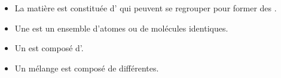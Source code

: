 \begin{mybilan}
	\begin{itemize}
		\item La matière est constituée d' qui peuvent se regrouper pour former des . 
		\item Une  est un ensemble d'atomes ou de molécules identiques.
		\item Un  est composé d'.
		\item Un mélange est composé de  différentes. 
	\end{itemize}
\end{mybilan}
